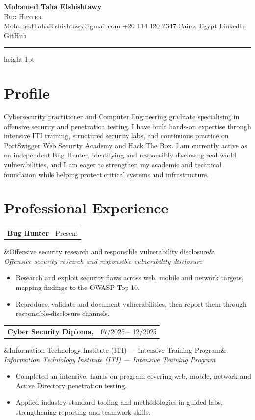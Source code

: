 \documentclass[11pt,a4paper]{article}
\makeatletter
\newcommand{\entry}[3]{%
  \noindent\begin{tabularx}{\linewidth}{@{}X r@{}}
    \textbf{#1} & {\color{muted}#3} \\
  \end{tabularx}%
  \ifx&#2&\else\vspace{1pt}\\[-2pt]{\color{muted}\itshape #2}\fi%
  \par\vspace{3pt}
}
\newenvironment{cvitems}
  {\begin{itemize}[leftmargin=1.3em,itemsep=2pt,topsep=3pt,parsep=0pt]}
  {\end{itemize}}
\makeatother
\begin{document}
{\Huge\bfseries Mohamed Taha Elshishtawy}\\[5pt]
{\large\color{accent}\scshape Bug Hunter}\\[7pt]
{\color{muted}%
\href{mailto:MohamedTahaElshishtawy@gmail.com}{MohamedTahaElshishtawy@gmail.com} \quad\textbar\quad
+20 114 120 2347 \quad\textbar\quad
Cairo, Egypt \quad\textbar\quad
\href{https://www.linkedin.com/in/mohamed-elshishtawy-871694194/}{LinkedIn}%
\quad\textbar\quad
\href{https://github.com/MohamedTahaElshishtawy}{GitHub}%
}

\vspace{3pt}
{\color{rule}\hrule height 1pt}
\vspace{2pt}

\section{Profile}
Cybersecurity practitioner and Computer Engineering graduate specialising in offensive
security and penetration testing. I have built hands-on expertise through intensive ITI
training, structured security labs, and continuous practice on PortSwigger Web Security
Academy and Hack The Box. I am currently active as an independent Bug Hunter, identifying
and responsibly disclosing real-world vulnerabilities, and I am eager to strengthen my
academic and technical foundation while helping protect critical systems and infrastructure.

\section{Professional Experience}
\entry{Bug Hunter \normalfont{--- Independent / Freelance}}{Offensive security research and responsible vulnerability disclosure}{Present}
\vspace{-2pt}
\begin{cvitems}
  \item Research and exploit security flaws across web, mobile and network targets, mapping findings to the OWASP Top 10.
  \item Reproduce, validate and document vulnerabilities, then report them through responsible-disclosure channels.
\end{cvitems}
\vspace{2pt}

\entry{Cyber Security Diploma, \normalfont{Trainee}}{Information Technology Institute (ITI) --- Intensive Training Program}{07/2025 -- 12/2025}
\vspace{-2pt}
\begin{cvitems}
  \item Completed an intensive, hands-on program covering web, mobile, network and Active Directory penetration testing.
  \item Applied industry-standard tooling and methodologies in guided labs, strengthening reporting and teamwork skills.
\end{cvitems}
\end{document}
